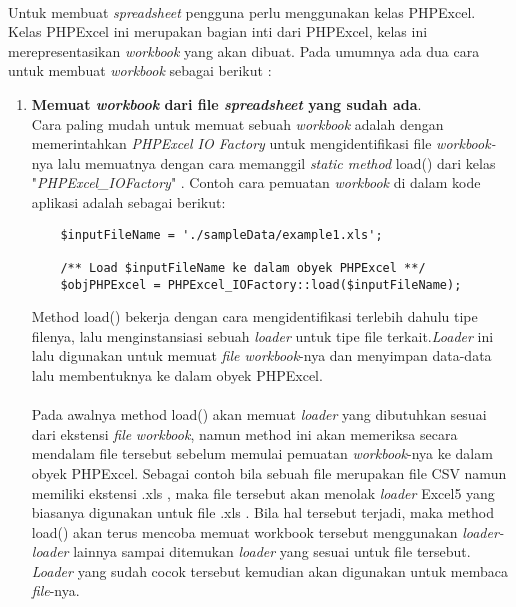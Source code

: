 \paragraph{} Untuk membuat \textit{spreadsheet} pengguna perlu menggunakan kelas PHPExcel. Kelas PHPExcel ini merupakan bagian inti dari PHPExcel, kelas ini merepresentasikan \textit{workbook} yang akan dibuat. Pada umumnya ada dua cara untuk membuat \textit{workbook} sebagai berikut :
\begin{enumerate}
	\item \textbf{Memuat \textit{workbook} dari file \textit{spreadsheet} yang sudah ada}.\\
Cara paling mudah untuk memuat sebuah \textit{workbook} adalah dengan memerintahkan \textit{PHPExcel IO Factory} untuk mengidentifikasi file \textit{workbook-}nya lalu memuatnya dengan cara memanggil \textit{static method} load() dari kelas "\textit{PHPExcel\_IOFactory}" . Contoh cara pemuatan \textit{workbook} di dalam kode aplikasi adalah sebagai berikut:
	\begin{lstlisting}
	$inputFileName = './sampleData/example1.xls';

	/** Load $inputFileName ke dalam obyek PHPExcel **/
	$objPHPExcel = PHPExcel_IOFactory::load($inputFileName);
	\end{lstlisting}
Method load() bekerja dengan cara mengidentifikasi terlebih dahulu tipe filenya, lalu menginstansiasi sebuah \textit{loader} untuk tipe file terkait.\textit{Loader} ini lalu digunakan untuk memuat \textit{file workbook}-nya dan menyimpan data-data lalu membentuknya ke dalam obyek PHPExcel. 
\paragraph{} Pada awalnya method load() akan memuat \textit{loader} yang dibutuhkan sesuai dari ekstensi \textit{file} \textit{workbook}, namun method ini akan memeriksa secara mendalam file tersebut sebelum memulai pemuatan \textit{workbook}-nya ke dalam obyek PHPExcel. Sebagai contoh bila sebuah file merupakan file CSV namun memiliki ekstensi .xls , maka file tersebut akan menolak \textit{loader} Excel5 yang biasanya digunakan untuk file .xls . Bila hal tersebut terjadi, maka method load() akan terus mencoba memuat workbook tersebut menggunakan \textit{loader-loader} lainnya sampai ditemukan \textit{loader} yang sesuai untuk file tersebut.  \textit{Loader} yang sudah cocok tersebut kemudian akan digunakan untuk membaca \textit{file}-nya.

\end{enumerate}
